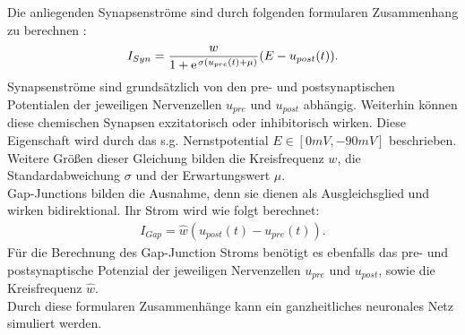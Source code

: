 	Die anliegenden Synapsenströme sind durch folgenden formularen Zusammenhang zu berechnen \cite{WormLevelRL}:
	\begin{align}
		\label{eq:chem_syn_current}
		I_{Syn} = \frac{w}{1 + \e^{\sigma(u_{pre}(t) + \mu)}}(E - u_{post}(t))\text{.}
	\end{align}
	Synapsenströme sind grundsätzlich von den pre- und postsynaptischen Potentialen der jeweiligen Nervenzellen $u_{pre}$ und $u_{post}$ abhängig. Weiterhin können diese chemischen Synapsen exzitatorisch oder inhibitorisch wirken. Diese Eigenschaft wird durch das s.g. Nernstpotential $E\in[0mV, -90mV]$ beschrieben. Weitere Größen dieser Gleichung bilden die Kreisfrequenz $w$, die Standardabweichung $\sigma$ und der Erwartungswert $\mu$.\\
	Gap-Junctions bilden die Ausnahme, denn sie dienen als Ausgleichsglied und wirken bidirektional. Ihr Strom wird wie folgt berechnet:
	\begin{align}
		\label{eq:gap_syn_current}
		I_{Gap} = \hat{w}(u_{post}(t) - u_{pre}(t))\text{.}
	\end{align}
	Für die Berechnung des Gap-Junction Stroms benötigt es ebenfalls das pre- und postsynaptische Potenzial der jeweiligen Nervenzellen $u_{pre}$ und $u_{post}$, sowie die Kreisfrequenz $\hat{w}$.\\	
	Durch diese formularen Zusammenhänge kann ein ganzheitliches neuronales Netz simuliert werden.
	
